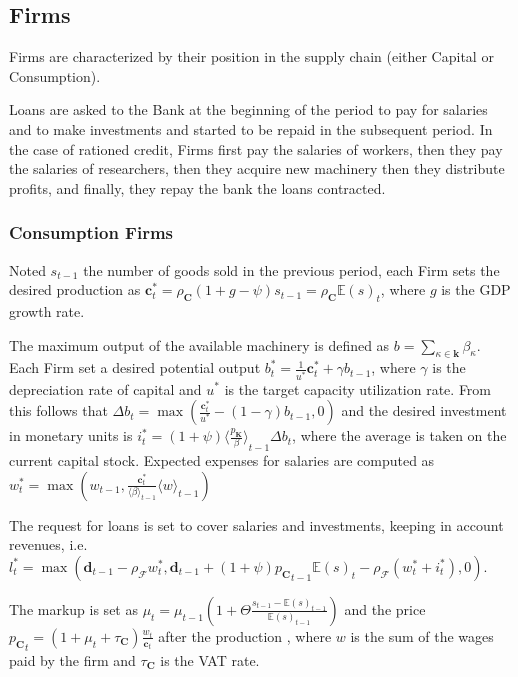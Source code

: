 \documentclass[a4paper, headings=standardclasses]{scrartcl}
\begin{document}
\subsection{Firms}
Firms are characterized by their position in the supply chain (either Capital or Consumption).

Loans are asked to the Bank at the beginning of the period to pay for salaries and to make investments and started to be repaid in the subsequent period.
In the case of rationed credit, Firms first pay the salaries of workers, then they pay the salaries of researchers, then they acquire new machinery then they distribute profits, and finally, they repay the bank the loans contracted.

\subsubsection{Consumption Firms}
Noted $s_{t-1}$ the number of goods sold in the previous period, each Firm sets the desired production as $\mathbf{c}^*_t = \rho_\mathbf{C}(1+g-\psi)s_{t-1} = \rho_\mathbf{C}{\mathbb{E}(s)}_t$, where $g$ is the GDP growth rate.

The maximum output of the available machinery is defined as $b = \sum_{\kappa \in \mathbf{k}} \beta_\kappa$. Each Firm set a desired potential output $b^*_t = \frac{1}{u^*}\mathbf{c}^*_t + \gamma b_{t-1}$, where $\gamma$ is the depreciation rate of capital and $u^*$ is the target capacity utilization rate. From this follows that ${\Delta b}_t = \max(\frac{\mathbf{c}^*_t}{u^*} - (1 - \gamma) b_{t-1}, 0)$ and the desired investment in monetary units is $i^*_t = (1+\psi){\langle\frac{{p_\mathbf{K}}}{\beta}\rangle}_{t-1}{\Delta b}_t$, where the average is taken on the current capital stock. Expected expenses for salaries are computed as $w_t^* = \max(w_{t-1}, \frac{\mathbf{c}^*_t}{{\langle \beta \rangle}_{t-1}}{\langle w \rangle}_{t-1})$

The request for loans is set to cover salaries and investments, keeping in account revenues, i.e. $l_t^* = \max(\mathbf{d}_{t-1} - \rho_\mathcal{F} w_t^*, \mathbf{d}_{t-1} + (1+\psi){p_\mathbf{C}}_{t-1} {\mathbb{E}(s)}_t - \rho_\mathcal{F} (w_t^* + i_t^*), 0)$.

The markup is set as $\mu_t = \mu_{t-1}(1 + \Theta \frac{s_{t-1}-{\mathbb{E}(s)}_{t-1}}{{\mathbb{E}(s)}_{t-1}})$ and the price ${p_\mathbf{C}}_t = (1+\mu_t+\tau_\mathbf{C})\frac{w_t}{\mathbf{c}_t}$ after the production \parencite[like in][]{caiani2016}, where $w$ is the sum of the wages paid by the firm and $\tau_\mathbf{C}$ is the VAT rate.
\end{document}
